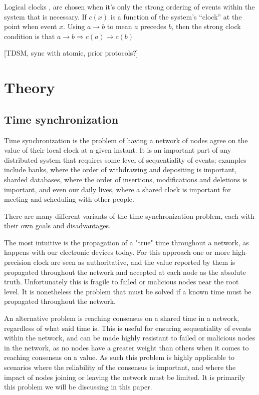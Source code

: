 \documentclass[a4paper,12pt]{article}
\begin{document}
Logical clocks \citet{Lamport78}, are chosen when it's only the strong
ordering of events within the system that is necessary.  If $c(x)$ is
a function of the system's ``clock'' at the point when event $x$.  Using
$a \rightarrow b$ to mean $a$ precedes $b$, then the strong clock condition is that
$a \rightarrow b \Rightarrow c(a) \rightarrow c(b)$

[TDSM, sync with atomic, prior protocols?]

\section{Theory}

\subsection{Time synchronization} %


Time synchronization is the problem of having a network of nodes agree on the value of their local clock at a given instant. It is an important part of any distributed system that requires some level of sequentiality of events; examples include banks, where the order of withdrawing and depositing is important, sharded databases, where the order of insertions, modifications and deletions is important, and even our daily lives, where a shared clock is important for meeting and scheduling with other people.

There are many different variants of the time synchronization problem, each with their own goals and disadvantages.

The most intuitive is the propagation of a "true" time throughout a network, as happens with our electronic devices today. For this approach one or more high-precision clock are seen as authoritative, and the value reported by them is propagated throughout the network and accepted at each node as the absolute truth. Unfortunately this is fragile to failed or malicious nodes near the root level. It is nonetheless the problem that must be solved if a known time must be propagated throughout the network.

An alternative problem is reaching consensus on a shared time in a network, regardless of what said time is. This is useful for ensuring sequentiality of events within the network, and can be made highly resistant to failed or malicious nodes in the network, as no nodes have a greater weight than others when it comes to reaching consensus on a value. As such this problem is highly applicable to scenarios where the reliability of the consensus is important, and where the impact of nodes joining or leaving the network must be limited. It is primarily this problem we will be discussing in this paper.
\end{document}
